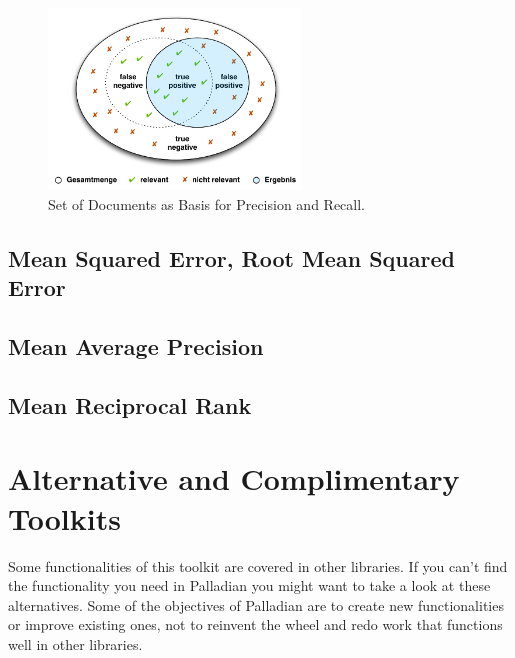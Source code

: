\documentclass[a4paper,twoside]{book}      %
\begin{document}
\begin{figure}[t!]
\centering
\includegraphics[width=0.6\textwidth]{img/PrecisionRecallMengen.pdf}
\caption{Set of Documents as Basis for Precision and Recall.}
\label{fig:PrecisionRecall}
\end{figure}

\subsection{Mean Squared Error, Root Mean Squared Error}

\subsection{Mean Average Precision}

\subsection{Mean Reciprocal Rank}

\section{Alternative and Complimentary Toolkits}
\label{sec:alternativesToPalladian}
Some functionalities of this toolkit are covered in other libraries. If you can't find the functionality you need in Palladian you might want to take a look at these alternatives. Some of the objectives of Palladian are to create new functionalities or improve existing ones, not to reinvent the wheel and redo work that functions well in other libraries.
\end{document}
